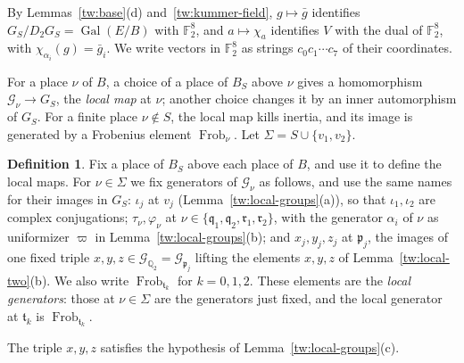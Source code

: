 \documentclass[11pt]{amsart}
\numberwithin{equation}{section}
\theoremstyle{definition}
\newtheorem{definition}[equation]{Definition}
\theoremstyle{remark}
\DeclareMathOperator{\Gal}{Gal}
\DeclareMathOperator{\Frob}{Frob}
\newcommand{\Ftwo}{\mathbb F_2}
\newcommand{\Q}{\mathbb Q}
\begin{document}
By Lemmas~\ref{tw:base}(d) and~\ref{tw:kummer-field}, $g\mapsto\bar g$
identifies $G_S/D_2G_S=\Gal(E/B)$ with $\Ftwo^8$, and $a\mapsto\chi_a$
identifies $V$ with the dual of $\Ftwo^8$, with $\chi_{\alpha_i}(g)=\bar g_i$.
We write vectors in $\Ftwo^8$ as strings $c_0c_1\cdots c_7$ of their
coordinates.

For a place $\nu$ of $B$, a choice of a place of $B_S$ above $\nu$ gives a
homomorphism $\mathcal G_\nu\to G_S$, the \emph{local map} at $\nu$; another
choice changes it by an inner automorphism of $G_S$. For a finite
place $\nu\notin S$, the local map kills inertia, and its image is generated
by a Frobenius element $\Frob_\nu$. Let $\Sigma=S\cup\{v_1,v_2\}$.

\begin{definition}\label{tw:local-generators}
Fix a place of $B_S$ above each place of $B$, and use it to define the local
maps. For $\nu\in\Sigma$ we fix generators of $\mathcal G_\nu$ as follows,
and use the same names for their images in $G_S$: $\iota_j$ at $v_j$
(Lemma~\ref{tw:local-groups}(a)), so that $\iota_1,\iota_2$ are complex
conjugations; $\tau_\nu,\varphi_\nu$ at
$\nu\in\{\mathfrak q_1,\mathfrak q_2,\mathfrak r_1,\mathfrak r_2\}$, with the
generator $\alpha_i$ of $\nu$ as uniformizer $\varpi$ in
Lemma~\ref{tw:local-groups}(b); and $x_j,y_j,z_j$ at $\mathfrak p_j$, the
images of one fixed triple $x,y,z\in\mathcal G_{\Q_2}=\mathcal G_{\mathfrak p_j}$
lifting the elements $x,y,z$ of Lemma~\ref{tw:local-two}(b). We also write
$\Frob_{\mathfrak t_k}$ for $k=0,1,2$. These elements are the \emph{local
generators}: those at $\nu\in\Sigma$ are the generators just fixed, and the
local generator at $\mathfrak t_k$ is $\Frob_{\mathfrak t_k}$.
\end{definition}

The triple $x,y,z$ satisfies the hypothesis of
Lemma~\ref{tw:local-groups}(c).
\end{document}
